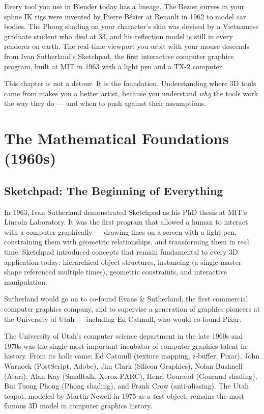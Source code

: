 \documentclass[11pt,letterpaper,twoside,openright]{book}
\begin{document}
\vspace{1em}
Every tool you use in Blender today has a lineage. The Bezier curves in your spline IK rigs were invented by Pierre B\'{e}zier at Renault in 1962 to model car bodies. The Phong shading on your character's skin was devised by a Vietnamese graduate student who died at 33, and his reflection model is still in every renderer on earth. The real-time viewport you orbit with your mouse descends from Ivan Sutherland's Sketchpad, the first interactive computer graphics program, built at MIT in 1963 with a light pen and a TX-2 computer.

This chapter is not a detour. It is the foundation. Understanding where 3D tools came from makes you a better artist, because you understand \textit{why} the tools work the way they do --- and when to push against their assumptions.

\section{The Mathematical Foundations (1960s)}

\subsection{Sketchpad: The Beginning of Everything}

In 1963, Ivan Sutherland demonstrated Sketchpad as his PhD thesis at MIT's Lincoln Laboratory. It was the first program that allowed a human to interact with a computer graphically --- drawing lines on a screen with a light pen, constraining them with geometric relationships, and transforming them in real time. Sketchpad introduced concepts that remain fundamental to every 3D application today: hierarchical object structures, instancing (a single master shape referenced multiple times), geometric constraints, and interactive manipulation.

Sutherland would go on to co-found Evans \& Sutherland, the first commercial computer graphics company, and to supervise a generation of graphics pioneers at the University of Utah --- including Ed Catmull, who would co-found Pixar.

\begin{historynote}
The University of Utah's computer science department in the late 1960s and 1970s was the single most important incubator of computer graphics talent in history. From its halls came: Ed Catmull (texture mapping, z-buffer, Pixar), John Warnock (PostScript, Adobe), Jim Clark (Silicon Graphics), Nolan Bushnell (Atari), Alan Kay (Smalltalk, Xerox PARC), Henri Gouraud (Gouraud shading), Bui Tuong Phong (Phong shading), and Frank Crow (anti-aliasing). The Utah teapot, modeled by Martin Newell in 1975 as a test object, remains the most famous 3D model in computer graphics history.
\end{historynote}
\end{document}
